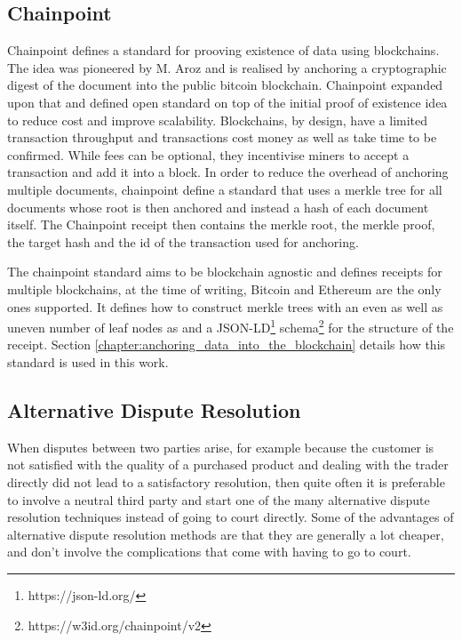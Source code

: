 \documentclass[12pt,msc,a4paper,oneside]{ucl_thesis}
\begin{document}
\subsection{Chainpoint} \label{sec:literature_chainpoint}
Chainpoint defines a standard for prooving existence of data using blockchains. The idea was pioneered by M. Aroz \cite{proof_of_existence} and is realised by anchoring a cryptographic digest of the document into the public bitcoin blockchain. Chainpoint expanded upon that and defined open standard on top of the initial proof of existence idea to reduce cost and improve scalability.
Blockchains, by design, have a limited transaction throughput and transactions cost money as well as take time to be confirmed. While fees can be optional, they incentivise miners to accept a transaction and add it into a block. In order to reduce the overhead of anchoring multiple documents, chainpoint define a standard that uses a merkle tree for all documents whose root is then anchored and instead a hash of each document itself. The Chainpoint receipt then contains the merkle root, the merkle proof, the target hash and the id of the transaction used for anchoring.

The chainpoint standard aims to be blockchain agnostic and defines receipts for multiple blockchains, at the time of writing, Bitcoin and Ethereum are the only ones supported. It defines how to construct merkle trees with an even as well as uneven number of leaf nodes as and a JSON-LD\footnote{https://json-ld.org/} schema\footnote{https://w3id.org/chainpoint/v2} for the structure of the receipt. Section \ref{chapter:anchoring_data_into_the_blockchain} details how this standard is used in this work.

\subsection{Alternative Dispute Resolution}
When disputes between two parties arise, for example because the customer is not satisfied with the quality of a purchased product and dealing with the trader directly did not lead to a satisfactory resolution, then quite often it is preferable to involve a neutral third party and start one of the many alternative dispute resolution techniques instead of going to court directly. Some of the advantages of alternative dispute resolution methods are that they are generally a lot cheaper, and don't involve the complications that come with having to go to court. \cite{adr_overview:findlaw}
\end{document}

